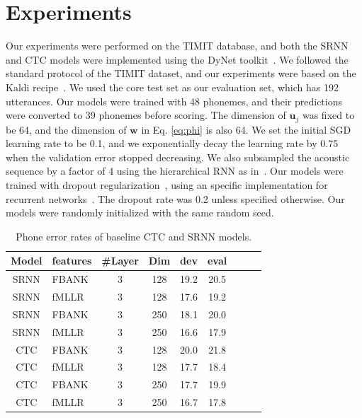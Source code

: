 \documentclass[a4paper]{article}
\begin{document}
\section{Experiments}

Our experiments were performed on the TIMIT database, and both the SRNN and CTC models were implemented using the DyNet toolkit~\cite{neubig2017dynet}. We followed the standard protocol of the TIMIT dataset, and our experiments were based on the Kaldi recipe~\cite{povey2011kaldi}. We used the core test set as our evaluation set, which has 192 utterances. Our models were trained with 48 phonemes, and their predictions were converted to 39 phonemes before scoring. The dimension of $\mathbf{u}_j$ was fixed to be 64, and the dimension of $\mathbf{w}$ in Eq. \eqref{eq:phi} is also 64. We set the initial SGD learning rate to be 0.1, and we exponentially decay the learning rate by 0.75 when the validation error stopped decreasing. We also subsampled the acoustic sequence by a factor of 4 using the hierarchical RNN as in~\cite{lu2016segmental}. Our models were trained with dropout regularization~\cite{srivastava2014dropout}, using an specific implementation for recurrent networks~\cite{zaremba2014recurrent}. The dropout rate was 0.2 unless specified otherwise. Our models were randomly initialized with the same random seed.

\begin{table}
 \centering \small
\caption{Phone error rates of baseline CTC and SRNN models. }
\label{tab:baseline}
\begin{tabular}{cl|ccccccc}
\hline

\hline
Model & features  & \#Layer & Dim & dev  & eval \\ \hline
SRNN & FBANK & 3 & 128 & 19.2 & 20.5 \\
SRNN & fMLLR & 3 & 128 & 17.6 & 19.2 \\
SRNN & FBANK & 3& 250 & 18.1 & 20.0\\
SRNN & fMLLR & 3 & 250 & 16.6 & 17.9 \\ \hline
CTC & FBANK & 3&  128 & 20.0 & 21.8 \\ 
CTC & fMLLR & 3 & 128 & 17.7 & 18.4 \\
CTC & FBANK & 3&  250 & 17.7 & 19.9 \\ 
CTC & fMLLR & 3 & 250 & 16.7 & 17.8 \\ \hline

\hline
\end{tabular}
\end{table}
\end{document}
